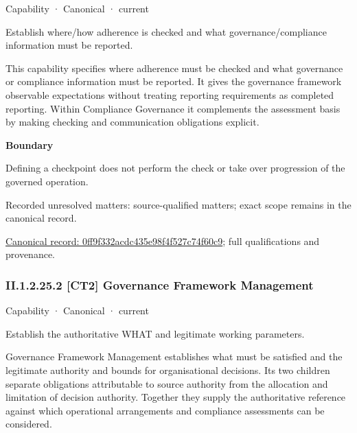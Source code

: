 \label{element:0ff9f332acdc435e98f4f527c74f60c9}
{\small Capability · Canonical · current}\par

Establish where/how adherence is checked and what governance/compliance information must be reported.



This capability specifies where adherence must be checked and what governance or compliance information must be reported. It gives the governance framework observable expectations without treating reporting requirements as completed reporting. Within Compliance Governance it complements the assessment basis by making checking and communication obligations explicit.



\textbf{Boundary}



Defining a checkpoint does not perform the check or take over progression of the governed operation.


{\small Recorded unresolved matters: source-qualified matters; exact scope remains in the canonical record.}\par
{\footnotesize \href{../../../../continuum/strategy/capability/0ff9f332acdc435e98f4f527c74f60c9.md}{Canonical record: 0ff9f332acdc435e98f4f527c74f60c9}; full qualifications and provenance.}\par
\subsubsection*{II.1.2.25.2 [CT2] Governance Framework Management}
\label{navigation:II.1.2.25.2}

\label{element:b39f53b3ffb441f388a89b45cc517deb}
{\small Capability · Canonical · current}\par

Establish the authoritative WHAT and legitimate working parameters.



Governance Framework Management establishes what must be satisfied and the legitimate authority and bounds for organisational decisions. Its two children separate obligations attributable to source authority from the allocation and limitation of decision authority. Together they supply the authoritative reference against which operational arrangements and compliance assessments can be considered.



